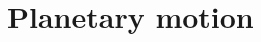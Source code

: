 \documentclass[12pt, a4paper]{article}
\DeclareMathOperator{\grad}{grad}
\begin{document}






\section{Planetary motion}
\end{document}
